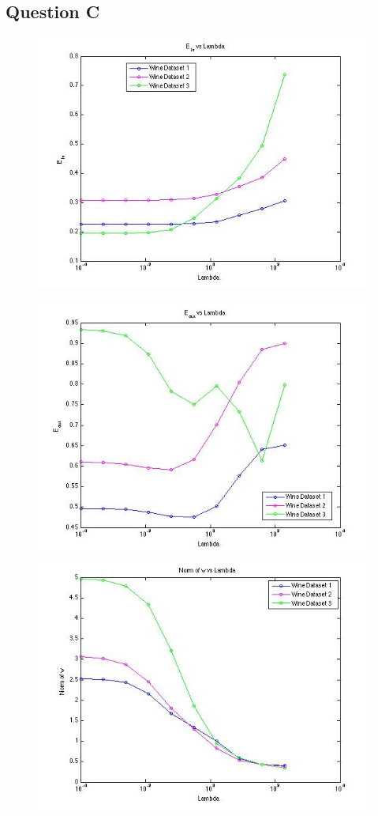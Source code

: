 \documentclass{article}
\begin{document}
\subsection*{Question C}
\begin{figure}[h]
\includegraphics[width=16cm]{e_in}
\end{figure}
\begin{figure}[p]
\includegraphics[width=16cm]{e_out}
\vspace{5mm}
\includegraphics[width=16cm]{w_norm}
\end{figure}
\end{document}
